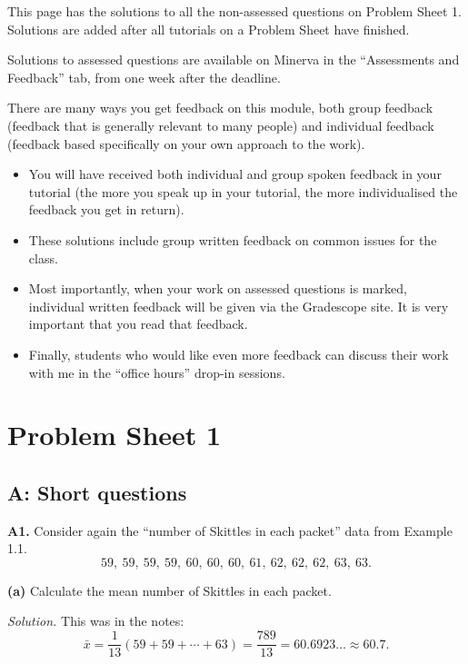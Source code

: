 \documentclass[
  a4paper,
]{book}
\theoremstyle{definition}
\theoremstyle{definition}
\theoremstyle{definition}
\theoremstyle{definition}
\theoremstyle{remark}
\begin{document}
This page has the solutions to all the non-assessed questions on Problem Sheet 1. Solutions are added after all tutorials on a Problem Sheet have finished.

Solutions to assessed questions are available on Minerva in the ``Assessments and Feedback'' tab, from one week after the deadline.

There are many ways you get feedback on this module, both group feedback (feedback that is generally relevant to many people) and individual feedback (feedback based specifically on your own approach to the work).

\begin{itemize}
\item
  You will have received both individual and group spoken feedback in your tutorial (the more you speak up in your tutorial, the more individualised the feedback you get in return).
\item
  These solutions include group written feedback on common issues for the class.
\item
  Most importantly, when your work on assessed questions is marked, individual written feedback will be given via the Gradescope site. It is very important that you read that feedback.
\item
  Finally, students who would like even more feedback can discuss their work with me in the ``office hours'' drop-in sessions.
\end{itemize}

\hypertarget{P1-solutions}{%
\section*{Problem Sheet 1}\label{P1-solutions}}

\hypertarget{P1-short-solutions}{%
\subsection*{A: Short questions}\label{P1-short-solutions}}

\textbf{A1.} Consider again the ``number of Skittles in each packet'' data from Example 1.1.
\[ 59, \ 59, \ 59, \ 59, \ 60, \ 60, \ 60, \ 61, \ 62, \ 62, \ 62, \ 63, \ 63 .\]

\textbf{(a)} Calculate the mean number of Skittles in each packet.

\begin{myanswers}
\emph{Solution.} This was in the notes:
\[ \bar x = \frac{1}{13} (59 + 59 + \cdots + 63) =  \frac{789}{13} = 60.6923\dots \approx 60.7 .\]

\end{myanswers}
\end{document}
